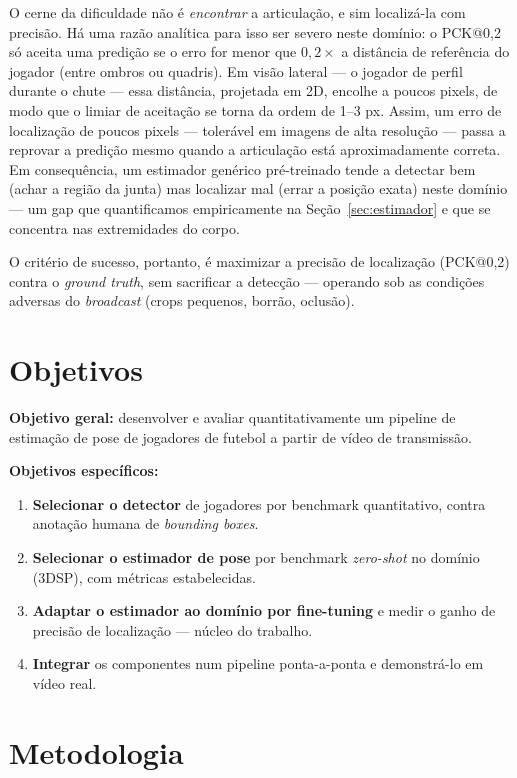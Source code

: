 \documentclass[12pt]{article}
\begin{document}
O cerne da dificuldade não é \emph{encontrar} a articulação, e sim localizá-la com precisão. Há uma razão analítica para isso ser severo neste domínio: o PCK@0,2 só aceita uma predição se o erro for menor que $0{,}2\times$ a distância de referência do jogador (entre ombros ou quadris). Em visão lateral --- o jogador de perfil durante o chute --- essa distância, projetada em 2D, encolhe a poucos pixels, de modo que o limiar de aceitação se torna da ordem de 1--3 px. Assim, um erro de localização de poucos pixels --- tolerável em imagens de alta resolução --- passa a reprovar a predição mesmo quando a articulação está aproximadamente correta. Em consequência, um estimador genérico pré-treinado tende a detectar bem (achar a região da junta) mas localizar mal (errar a posição exata) neste domínio --- um gap que quantificamos empiricamente na Seção~\ref{sec:estimador} e que se concentra nas extremidades do corpo.

O critério de sucesso, portanto, é maximizar a precisão de localização (PCK@0,2) contra o \emph{ground truth}, sem sacrificar a detecção --- operando sob as condições adversas do \emph{broadcast} (crops pequenos, borrão, oclusão).

\section{Objetivos}

\textbf{Objetivo geral:} desenvolver e avaliar quantitativamente um pipeline de estimação de pose de jogadores de futebol a partir de vídeo de transmissão.

\noindent\textbf{Objetivos específicos:}
\begin{enumerate}
  \item \textbf{Selecionar o detector} de jogadores por benchmark quantitativo, contra anotação humana de \emph{bounding boxes}.
  \item \textbf{Selecionar o estimador de pose} por benchmark \emph{zero-shot} no domínio (3DSP), com métricas estabelecidas.
  \item \textbf{Adaptar o estimador ao domínio por fine-tuning} e medir o ganho de precisão de localização --- núcleo do trabalho.
  \item \textbf{Integrar} os componentes num pipeline ponta-a-ponta e demonstrá-lo em vídeo real.
\end{enumerate}

\section{Metodologia}
\end{document}
